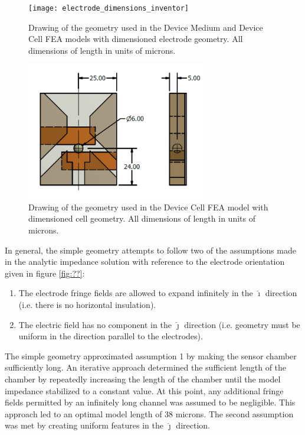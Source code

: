 \begin{figure}
    \centering
    \texttt{[image: electrode\_dimensions\_inventor]}
    \caption{Drawing of the geometry used in the Device Medium and Device Cell FEA models with dimensioned electrode geometry. All dimensions of length in units of microns.}
    \label{fig:device_electrode_dimensions_FEA}
\end{figure}
\begin{figure}
    \centering
    \includegraphics[width=0.7\textwidth]{images/particle_dimension_inventor.png}
    \caption{Drawing of the geometry used in the Device Cell FEA model with dimensioned cell geometry. All dimensions of length in units of microns.}
    \label{fig:device_cell_dimensions_FEA}
\end{figure}



\par In general, the simple geometry attempts to follow two of the assumptions made in the analytic impedance solution with reference to the electrode orientation given in figure \ref{fig:??}:
\begin{enumerate}
    \item The electrode fringe fields are allowed to expand infinitely in the $\hat{\boldsymbol\imath}$ direction (i.e. there is no horizontal insulation).
    \item The electric field has no component in the $\hat{\boldsymbol\jmath}$ direction (i.e. geometry must be uniform in the direction parallel to the electrodes).
\end{enumerate}

\par The simple geometry approximated assumption 1 by making the sensor chamber sufficiently long. An iterative approach determined the sufficient length of the chamber by repeatedly increasing the length of the chamber until the model impedance stabilized to a constant value. At this point, any additional fringe fields permitted by an infinitely long channel was assumed to be negligible. This approach led to an optimal model length of 38 microns. The second assumption was met by creating uniform features in the $\hat{\boldsymbol\jmath}$ direction.

